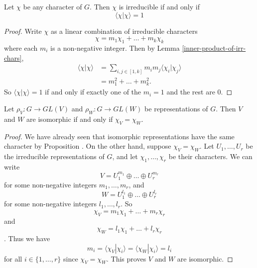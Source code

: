 \begin{cor}
Let $\chi$ be any character of $G$.    Then $\chi$ is irreducible if and only if \[ \langle \chi | \chi \rangle = 1\]
\end{cor}
\begin{proof}
Write $\chi$ as a linear combination of irreducible characters \[ \chi = m_1 \chi_1 + \ldots + m_k \chi_k \] where each $m_i$ is a non-negative integer.  Then by Lemma \ref{inner-product-of-irr-chars}, 
\begin{align*}
\langle \chi | \chi \rangle &= \sum_{i,j \in [1, k]} m_i m_j \langle \chi_i | \chi_j \rangle \\
&= m_1^2 + \ldots + m_k^2.
\end{align*}
So $\langle \chi | \chi \rangle = 1$ if and only if exactly one of the $m_i = 1$ and the rest are $0$.
\end{proof}

\begin{cor}
Let $\rho_V \colon G \to GL(V)$ and $\rho_W \colon G \to GL(W)$ be representations of $G$.  Then $V$ and $W$ are isomorphic if and only if $\chi_V = \chi_W$.
\end{cor}
\begin{proof}
We have already seen that isomorphic representations have the same character by Proposition \label{iso-reprns-same-char}.  On the other hand, suppose $\chi_V = \chi_W$.  Let $U_1, \ldots, U_r$ be the irreducible representations of $G$, and let $\chi_1, \ldots, \chi_r$ be their characters.  We can write
\[ V = U_1^{m_1} \oplus \ldots \oplus U_r^{m_r} \]
for some non-negative integers $m_1, \ldots, m_r$, and 
\[ W = U_1^{l_1} \oplus \ldots \oplus U_r^{l_r} \]
for some non-negative integers $l_1, \ldots, l_r$.  So
\[ \chi_V = m_1 \chi_1 + \ldots + m_r \chi_r \]
and 
\[ \chi_W = l_1 \chi_1 + \ldots + l_r \chi_r \].
Thus we have 
\[ m_i = \langle \chi_V | \chi_i \rangle = \langle \chi_W | \chi_i \rangle = l_i \]
for all $i \in \{1, \ldots, r \}$ since $\chi_V = \chi_W$.  This proves $V$ and $W$ are isomorphic.
\end{proof}